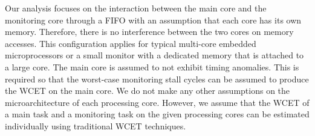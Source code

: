 Our analysis focuses on the interaction between the main core and the
monitoring core through a FIFO with an assumption that each core has its own
memory. Therefore, there is no interference between the two cores on memory
accesses. This configuration applies for typical multi-core embedded
microprocessors or a small monitor with a dedicated memory that is attached to
a large core. The main core is assumed to not exhibit timing anomalies. This is
required so that the worst-case monitoring stall cycles can be assumed to
produce the WCET on the main core.  We do not make any other assumptions on the
microarchitecture of each processing core. However, we assume that the WCET of
a main task and a monitoring task on the given processing cores can be
estimated individually using traditional WCET techniques.

